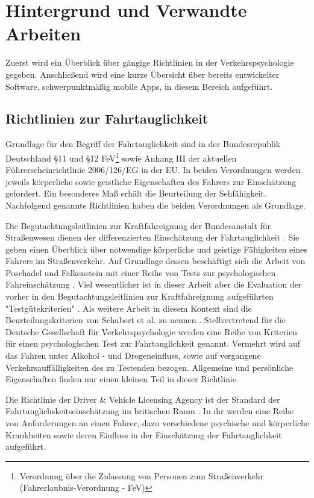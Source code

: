 \section{Hintergrund und Verwandte Arbeiten}
\label{relatedWork}
Zuerst wird ein Überblick über gängige Richtlinien in der Verkehrspsychologie gegeben. Anschließend wird eine kurze Übersicht über bereits entwickelter Software, schwerpunktmäßig mobile Apps, in diesem Bereich aufgeführt. 

\subsection{Richtlinien zur Fahrtauglichkeit} 

Grundlage für den Begriff der Fahrtauglichkeit sind in der Bundesrepublik Deutschland \S 11 und \S 12 FeV\footnote{\label{foot:fev}Verordnung über die Zulassung von Personen zum Straßenverkehr (Fahrerlaubnis-Verordnung - FeV)} sowie Anhang III der aktuellen Führerscheinrichtlinie 2006/126/EG in der EU. In beiden Verordnungen werden jeweils körperliche sowie geistliche Eigenschaften des Fahrers zur Einschätzung gefordert. Ein besonderes Maß erhält die Beurteilung der Sehfähigkeit. Nachfolgend genannte Richtlinien haben die beiden Verordnungen als Grundlage.

Die Begutachtungsleitlinien zur Kraftfahreignung der Bundesanstalt für Straßenwesen dienen der differenzierten Einschätzung der Fahrtauglichkeit \cite{begutachtungsrichtlinien}. Sie geben einen Überblick über notwendige körperliche und geistige Fähigkeiten eines Fahrers im Straßenverkehr.
Auf Grundlage dessen beschäftigt sich die Arbeit von Poschadel und Falkenstein mit einer Reihe von Tests zur psychologischen Fahreinschätzung \cite{testverfahrenpsychometrischefahreignung}. Viel wesentlicher ist in dieser Arbeit aber die Evaluation der vorher in den Begutachtungsleitlinien zur Kraftfahreignung aufgeführten "Testgütekriterien" \cite{begutachtungsrichtlinien}. Als weitere Arbeit in diesem Kontext sind die Beurteilungskriterien von Schubert et al. zu nennen \cite{beurteilungskriterien}. Stellvertretend für die Deutsche Gesellschaft für Verkehrspsychologie werden eine Reihe von Kriterien für einen psychologischen Test zur Fahrtauglichkeit genannt. Vermehrt wird  auf das Fahren unter Alkohol - und Drogeneinfluss, sowie auf vergangene Verkehrsauffälligkeiten des zu Testenden bezogen. Allgemeine und persönliche Eigenschaften finden nur einen kleinen Teil in dieser Richtlinie. 

Die Richtlinie der Driver \& Vehicle Licensing Agency ist der Standard der Fahrtauglichskeitseinschätzung im britischen Raum \cite{drivervehiclelicencingagency}. In ihr werden eine Reihe von Anforderungen an einen Fahrer, dazu verschiedene psychische und körperliche Krankheiten sowie deren Einfluss in der Einschätzung der Fahrtauglichkeit aufgeführt.

